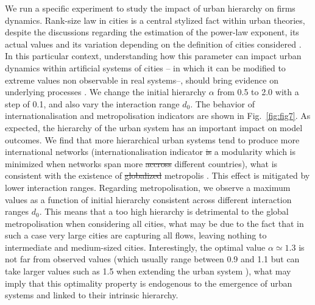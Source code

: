 \documentclass[10pt,letterpaper]{article}
\providecommand{\DIFadd}[1]{{\protect\color{blue}\uwave{#1}}} %
\providecommand{\DIFdel}[1]{{\protect\color{red}\sout{#1}}}                      %
\providecommand{\DIFaddbegin}{} %
\providecommand{\DIFaddend}{} %
\providecommand{\DIFdelbegin}{} %
\providecommand{\DIFdelend}{} %
\begin{document}
We run a specific experiment to study the impact of urban hierarchy on firms dynamics. Rank-size law in cities is a central stylized fact within urban theories, despite the discussions regarding the estimation of the power-law exponent, its actual values and its variation depending on the definition of cities considered \cite{cottineau2017metazipf,corral2020truncated}. In this particular context, understanding how this parameter can impact urban dynamics within artificial systems of cities -- in which it can be modified to extreme values non observable in real systems--, should bring evidence on underlying processes \cite{raimbault2019space}. We change the initial hierarchy $\alpha$ from 0.5 to 2.0 with a step of 0.1, and also vary the interaction range $d_0$. The behavior of internationalisation and metropolisation indicators are shown in Fig.~\ref{fig:fig7}. As expected, the hierarchy of the urban system has an important impact on model outcomes. We find that more hierarchical urban systems tend to produce more international networks (internationalisation indicator \DIFdelbegin \DIFdel{is }\DIFdelend \DIFaddbegin \DIFadd{corresponds to }\DIFaddend a modularity which is minimized when networks span more \DIFdelbegin \DIFdel{accross }\DIFdelend \DIFaddbegin \DIFadd{across }\DIFaddend different countries), what is consistent with the existence of \DIFdelbegin \DIFdel{globalized }\DIFdelend \DIFaddbegin \DIFadd{globalised }\DIFaddend metropolis \cite{sassen1991global}. This effect is mitigated by lower interaction ranges. Regarding metropolisation, we observe a maximum values as a function of initial hierarchy consistent across different interaction ranges $d_0$. This means that a too high hierarchy is detrimental to the global metropolisation when considering all cities, what may be due to the fact that in such a case very large cities are capturing all flows, leaving nothing to intermediate and medium-sized cities. Interestingly, the optimal value $\alpha \simeq 1.3$ is not far from observed values (which usually range between 0.9 and 1.1 but can take larger values such as 1.5 when extending the urban system \cite{Raimbault_2020}), what may imply that this optimality property is endogenous to the emergence of urban systems and linked to their intrinsic hierarchy.
\end{document}
